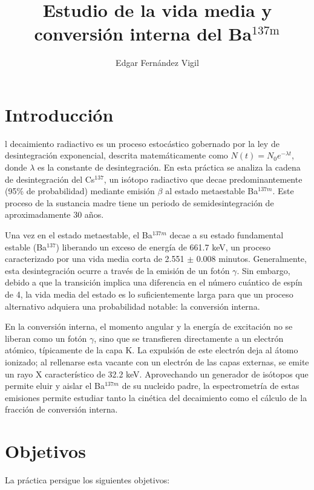 \documentclass[9pt,a4paper,twocolumn,twoside]{rho-class/rho}
\title{Estudio de la vida media y conversión interna del Ba$^{137\text{m}}$}
\author{Edgar Fernández Vigil}
\affil{Física - Facultad de Ciencias - Universidad de Oviedo}
\begin{document}
    \maketitle
    \thispagestyle{firststyle}

\section{Introducción}

l decaimiento radiactivo es un proceso estocástico gobernado por la ley de desintegración exponencial, descrita matemáticamente como $N(t)=N_{0}e^{-\lambda t}$, donde $\lambda$ es la constante de desintegración. En esta práctica se analiza la cadena de desintegración del Cs$^{137}$, un isótopo radiactivo que decae predominantemente (95\% de probabilidad) mediante emisión $\beta$ al estado metaestable Ba$^{137m}$. Este proceso de la sustancia madre tiene un periodo de semidesintegración de aproximadamente 30 años.

Una vez en el estado metaestable, el Ba$^{137m}$ decae a su estado fundamental estable (Ba$^{137}$) liberando un exceso de energía de 661.7 keV, un proceso caracterizado por una vida media corta de 2.551 $\pm$ 0.008 minutos. Generalmente, esta desintegración ocurre a través de la emisión de un fotón $\gamma$. Sin embargo, debido a que la transición implica una diferencia en el número cuántico de espín de 4, la vida media del estado es lo suficientemente larga para que un proceso alternativo adquiera una probabilidad notable: la conversión interna.

En la conversión interna, el momento angular y la energía de excitación no se liberan como un fotón $\gamma$, sino que se transfieren directamente a un electrón atómico, típicamente de la capa K. La expulsión de este electrón deja al átomo ionizado; al rellenarse esta vacante con un electrón de las capas externas, se emite un rayo X característico de 32.2 keV. Aprovechando un generador de isótopos que permite eluir y aislar el Ba$^{137m}$ de su nucleido padre, la espectrometría de estas emisiones permite estudiar tanto la cinética del decaimiento como el cálculo de la fracción de conversión interna.

\section{Objetivos}
La práctica persigue los siguientes objetivos:
\end{document}
